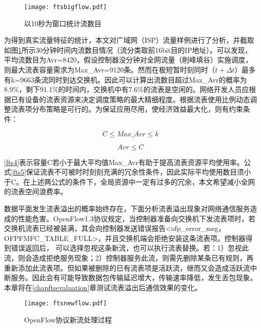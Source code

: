 \begin{figure}[!ht]
	\vspace{-1.5mm}
	\centering 
	\texttt{[image: ftsbigflow.pdf]}
	\caption{以10秒为窗口统计流数目} \label{fig:ftsbigflow}
\end{figure}

为得到真实流量特征的统计，本文对广域网（ISP）流量样例进行了分析，并截取如图\ref{fig:ftsbigflow}所示30分钟时间内流数目情况（流分类取前16bit目的IP地址）。可以发现，平均流数目为Avr=8420，假设控制器没分钟对全网流量（削峰填谷）实施调度，则最大流表容量需求为Max\_Avr=9120条。然而在极短暂时刻同时（$t+\Delta t$）最多有k=9663条流同时到达交换机。因此可以计算出流数目超过Max\_Avr的概率为8.9\%，剩下91.1\%的时间内，交换机中有7.6\%的流表是空闲的。网络开发人员应根据已有设备的流表资源来决定调度策略的最大精细程度。根据流表使用比例动态调整流表项分布策略是可行的。为保证应用尽用，使经济效益最大化，则有约束条件：

\begin{equation}\label{fts4}
C \leq Max\_Avr \leq k 
\end{equation}

\begin{equation}\label{fts5}
Avr \leq C 
\end{equation}

\ref{fts4}表示容量C若小于最大平均值Max\_Avr有助于提高流表资源平均使用率。公式\ref{fts5}保证流表不可被时时刻刻充满的冗余性条件，因此实际平均使用数目须小于C。在上述两公式的条件下，全局资源中一定有过多的冗余，本文希望减小全网的流表空间浪费率。

数据平面发生流表溢出的概率始终存在，下面分析流表溢出现象对网络通信服务造成的性能危害。OpenFlow1.3协议规定，当控制器准备向交换机下发流表项时，若交换机流表已经被装满，其会向控制器发送错误报告<ofp\_error\_msg，OFPFMFC\_TABLE\_FULL>，并且交换机端会拒绝安装这条流表项。控制器得到错误返回后， 可以选择忽视这条新流，也可以执行流表替换。若：1）忽视此流，则会造成拒绝服务现象；2）控制器服务此流，则需先删除某条已有规则，再重新添加此流表项。但如果被删除的已有流表项是活跃流，继而又会造成活跃流中断服务。因此会有可能导致数据包传输延迟增大，传输速率降低，发生丢包现象。本章将在\ref{chapftsevaluation}章测试流表溢出后通信效果的变化。



\begin{figure}[!ht]
	\centering 
	\vspace{-1.5mm} 
	\texttt{[image: ftsnewflow.pdf]}
	\caption{OpenFlow协议新流处理过程} \label{fig:ftsnewflow}
\end{figure}


